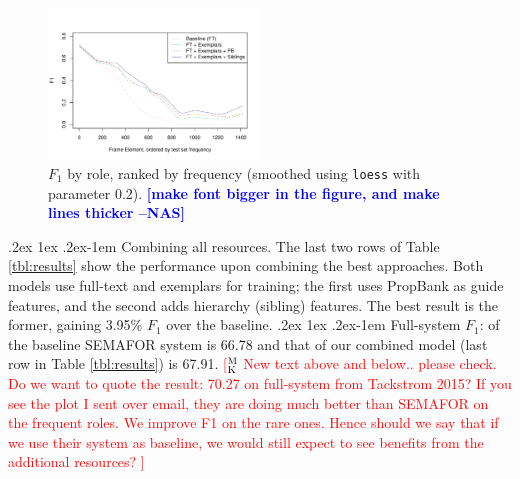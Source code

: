 \documentclass[11pt,a4paper]{article}
\makeatletter
\newcommand{\ensuretext}[1]{#1}
\newcommand{\mkmarker}{\ensuretext{\textcolor{red}{\ensuremath{^{\textsc{M}}_{\textsc{K}}}}}}
\newcommand{\arkcomment}[3]{\ensuretext{\textcolor{#3}{[#1 #2]}}}
\newcommand{\mk}[1]{\arkcomment{\mkmarker}{#1}{red}}
\newcommand{\nascomment}[1]{\textcolor{blue}{\textbf{\small [#1 --NAS]}}}
\renewcommand{\paragraph}{%
  \@startsection{paragraph}{4}%
  {\z@}{.2ex \@plus 1ex \@minus .2ex}{-1em}%
  {\normalfont\normalsize\bfseries}%
}
\makeatother
\begin{document}
\begin{figure}[t]
		\includegraphics[width=0.5\textwidth]{fig/f1_sorted_by_num_instances}
\caption{\label{fig:coolplot}$F_1$ by role, ranked by frequency
  (smoothed using \texttt{loess} with parameter 0.2). \nascomment{make
  font bigger in the figure, and make lines thicker}}
\end{figure}


\paragraph{Combining all resources.} The last two rows of Table
\ref{tbl:results} show the performance upon combining the best
approaches.  Both models use full-text and exemplars for training; the
first uses PropBank as guide features, and the second adds hierarchy (sibling) features.  
The best result is the former, gaining 3.95\% $F_1$ over the baseline.
\paragraph{Full-system $F_1$}: of the baseline SEMAFOR system is 
66.78 and that of our combined model (last row in Table \ref{tbl:results}) is 67.91.
\mk{New text above and below.. please check. Do we want to quote the result: 70.27 on full-system 
from Tackstrom 2015? If you see the plot I sent over email, they
are doing much better than SEMAFOR on the frequent roles. We improve F1 on the rare ones.
Hence should we say that if we use their system as baseline, we would still
expect to see benefits from the additional resources? } 
\end{document}
